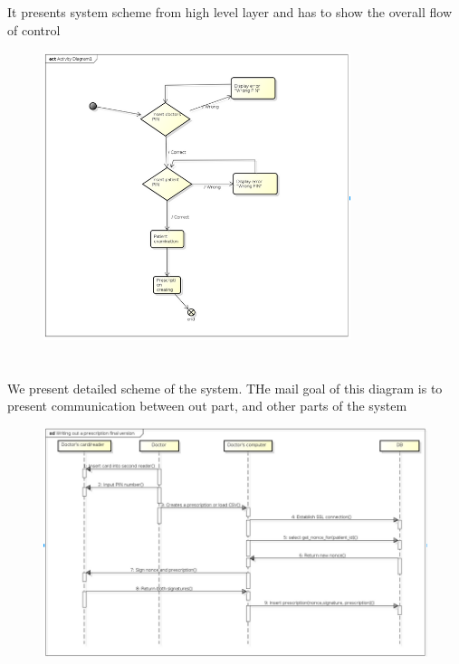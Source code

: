\section{}
It presents system scheme from high level layer and has to show the overall flow of control
\begin{figure}[h]
\centering
\includegraphics[width=0.8\textwidth]{doctor/ActivityDiagram.png}
\end{figure} 

\chapter{}
We present detailed scheme of the system. THe mail goal of this diagram is to present communication between out part, and other parts of the system

\begin{figure}[h]
\centering
\includegraphics[width=\textwidth]{doctor/WritingOutPrescription.png}
\end{figure} 


